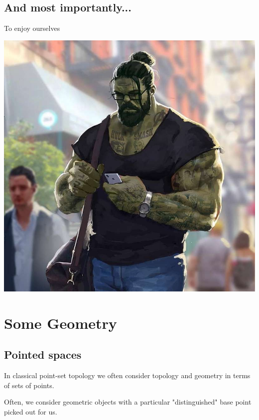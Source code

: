 \documentclass[tikz]{beamer}
\newcommand{\mred}[1]{\textcolor{red}{$#1$}}
\theoremstyle{definition}
\begin{document}
\subsection{And most importantly...}
\frame
{
To enjoy ourselves 

	\begin{center}
		\includegraphics[scale=0.25]{tender_hulk}
	\end{center}
}

\section{Some Geometry}
\subsection{Pointed spaces}

\frame
{
In classical point-set topology we often consider topology and geometry in terms of sets of points.  
}

\frame
{
Often, we consider geometric objects with a particular "distinguished" base point picked out for us. 

\begin{center}
\end{center}
}
\end{document}
